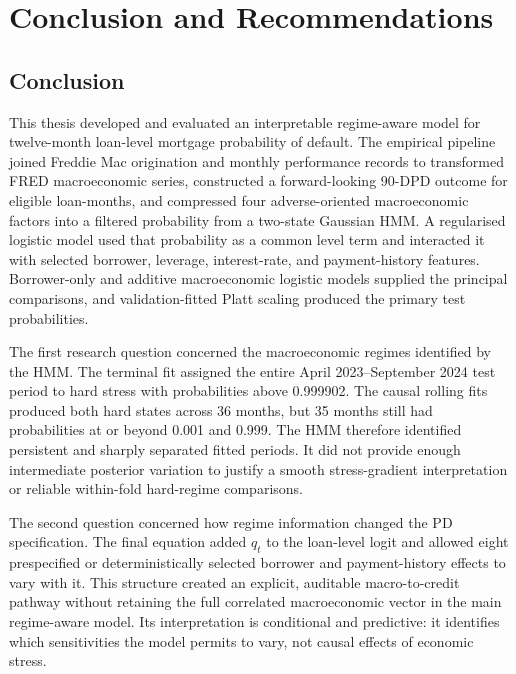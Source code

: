 \chapter{Conclusion and Recommendations}
\label{chap:conclusion}

\section{Conclusion}

This thesis developed and evaluated an interpretable regime-aware model for twelve-month loan-level mortgage probability of default. The empirical pipeline joined Freddie Mac origination and monthly performance records to transformed FRED macroeconomic series, constructed a forward-looking 90-DPD outcome for eligible loan-months, and compressed four adverse-oriented macroeconomic factors into a filtered probability from a two-state Gaussian HMM. A regularised logistic model used that probability as a common level term and interacted it with selected borrower, leverage, interest-rate, and payment-history features. Borrower-only and additive macroeconomic logistic models supplied the principal comparisons, and validation-fitted Platt scaling produced the primary test probabilities.

The first research question concerned the macroeconomic regimes identified by the HMM. The terminal fit assigned the entire April 2023--September 2024 test period to hard stress with probabilities above 0.999902. The causal rolling fits produced both hard states across 36 months, but 35 months still had probabilities at or beyond 0.001 and 0.999. The HMM therefore identified persistent and sharply separated fitted periods. It did not provide enough intermediate posterior variation to justify a smooth stress-gradient interpretation or reliable within-fold hard-regime comparisons.

The second question concerned how regime information changed the PD specification. The final equation added $q_t$ to the loan-level logit and allowed eight prespecified or deterministically selected borrower and payment-history effects to vary with it. This structure created an explicit, auditable macro-to-credit pathway without retaining the full correlated macroeconomic vector in the main regime-aware model. Its interpretation is conditional and predictive: it identifies which sensitivities the model permits to vary, not causal effects of economic stress.

